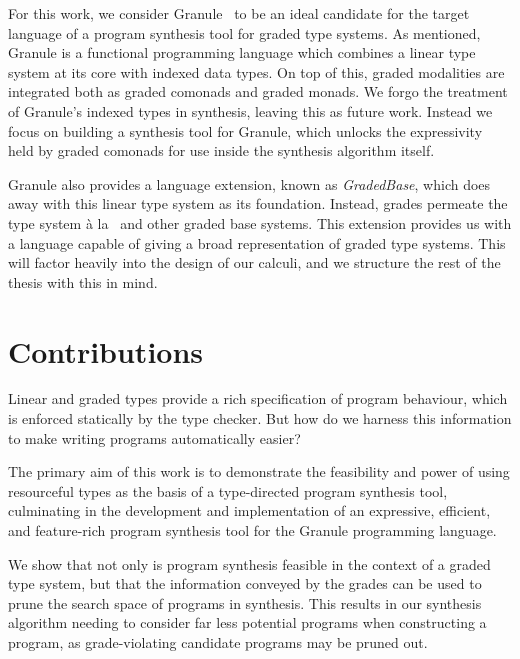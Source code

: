 For this work, we consider Granule~\citep{DBLP:journals/pacmpl/OrchardLE19} to
be an ideal candidate for the target language of a program synthesis tool for
graded type systems. As mentioned, Granule is a functional programming language
which combines a linear type system at its core with indexed data types. On top
of this, graded modalities are integrated both as graded comonads and graded
monads. We forgo the treatment of Granule's indexed types in synthesis, leaving
this as future work. Instead we focus on building a synthesis tool for Granule,
which unlocks the expressivity held by graded comonads for use inside the
synthesis algorithm itself.

Granule also provides a language extension, known as \emph{GradedBase}, which
does away with this linear type system as its foundation. Instead, grades
permeate the type system à la~\citet{petricek2014coeffects} and other graded
base systems. This extension provides us with a language capable of giving a
broad representation of graded type systems. This will factor heavily into the
design of our calculi, and we structure the rest of the thesis with this in
mind.

\section{Contributions}
Linear and graded types provide a rich specification of program behaviour, which
is enforced statically by the type checker. But how do we harness this
information to make    
writing programs automatically easier?  
 
The primary aim of this work is to demonstrate the feasibility and power of
using resourceful types as the basis of a type-directed program synthesis tool,
culminating in the development and implementation of an expressive, efficient,
and feature-rich program synthesis tool for the Granule programming language. 

We show that not only is program synthesis feasible in the context
of a graded type system, but that the information conveyed by the grades can be
used to prune the search space of programs in synthesis. This results in our
synthesis algorithm needing to consider far less potential programs when
constructing a program, as grade-violating candidate programs may be pruned out. 


